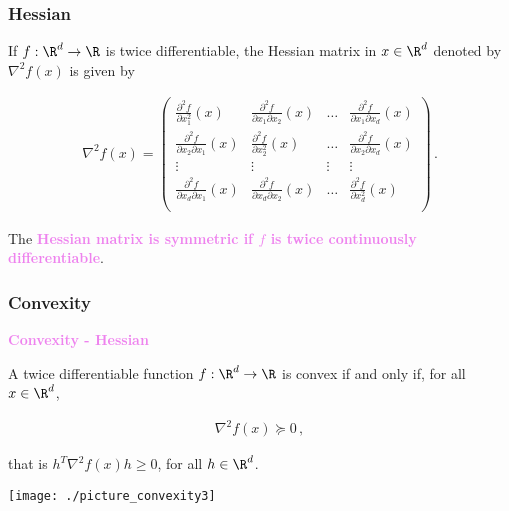 \documentclass[xcolor={usenames,dvipsnames}]{beamer}
\begin{document}
\begin{frame}
	\frametitle{Hessian}
	
	\large 
	
	If $f: \R^d \to \R$ is \alert{twice differentiable}, the \alert{Hessian matrix in $x\in\R^d$} denoted by $\nabla^2 f(x)$ is given by
	
	\bigskip 

	
\begin{align*}
	\nabla^2 f (x) = 
	\begin{pmatrix}
	\frac{\partial^2 f}{\partial x_1^2}(x) & \frac{\partial^2 f}{\partial x_1 \partial x_2}(x) & \hdots & \frac{\partial^2 f}{\partial x_1 \partial x_d}(x) \\
	\frac{\partial^2 f}{\partial x_2 \partial x_1}(x) & \frac{\partial^2 f}{\partial x_2^2}(x) & \hdots & \frac{\partial^2 f}{\partial x_2 \partial x_d}(x) \\
	\vdots & \vdots & \vdots & \vdots \\
	\frac{\partial^2 f}{\partial x_d \partial x_1}(x) & \frac{\partial^2 f}{\partial x_d \partial x_2}(x) & \hdots & \frac{\partial^2 f}{\partial x_d^2}(x) \\
	\end{pmatrix}\,.
\end{align*}

\bigskip 
	\bigskip 

The \textbf{\textcolor{violet}{Hessian matrix is symmetric if $f$ is twice continuously differentiable}}.

\end{frame}

\begin{frame}
	\frametitle{Convexity}
	
\textbf{\textcolor{violet}{Convexity - Hessian}}

A \alert{twice differentiable function $f : \R^d \to \R$} is convex if and only if, for all $x\in\R^d$,

\begin{align*}
\nabla^2 f(x) \succeq 0\,, 
\end{align*}

that is $h^T \nabla^2 f(x) h \geqslant 0$, for all $h \in \R^d$.

\vspace{0.4cm}

	\begin{center}
		\texttt{[image: ./picture\_convexity3]}
	\end{center}
\end{frame}
\end{document}

